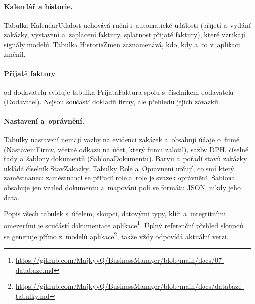\paragraph{Kalendář a historie.} Tabulka KalendarUdalost uchovává ruční i~automatické události (přijetí a~vydání zakázky, vystavení a~zaplacení faktury, splatnost přijaté faktury), které vznikají signály modelů. Tabulka HistorieZmen zaznamenává, kdo, kdy a~co v~aplikaci změnil.

\paragraph{Přijaté faktury} od dodavatelů eviduje tabulka PrijataFaktura spolu s~číselníkem dodavatelů (Dodavatel). Nejsou součástí dokladů firmy, ale přehledu jejích závazků.

\paragraph{Nastavení a~oprávnění.} Tabulky nastavení nemají vazby na evidenci zakázek a~obsahují údaje o~firmě (NastaveniFirmy, včetně odkazu na účet, který firmu založil), sazby DPH, číselné řady a~šablony dokumentů (SablonaDokumentu). Barvu a~pořadí stavů zakázky ukládá číselník StavZakazky. Tabulky Role a~Opravneni určují, co smí který zaměstnanec: zaměstnanci se přiřadí role a~role je svazek oprávnění. Šablona obsahuje jen vzhled dokumentu a~mapování polí ve formátu JSON, nikdy jeho data.

Popis všech tabulek s~účelem, sloupci, datovými typy, klíči a~integritními omezeními je součástí dokumentace aplikace\footnote{\url{https://github.com/MajkyyQ/BusinessManager/blob/main/docs/07-databaze.md}}. Úplný referenční přehled sloupců se generuje přímo z~modelů aplikace\footnote{\url{https://github.com/MajkyyQ/BusinessManager/blob/main/docs/databaze-tabulky.md}}, takže vždy odpovídá aktuální verzi.
